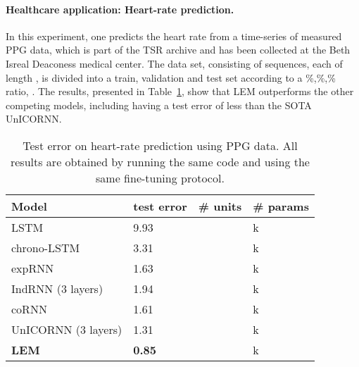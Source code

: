 \documentclass{article} \usepackage{iclr2022_conference,times}
\newcommand{\Tref}[1]{Table~\ref{#1}}
\begin{document}
\paragraph{Healthcare application: Heart-rate prediction.}
In this experiment, one predicts the heart rate from a time-series of measured PPG data, which is part of the TSR archive \citep{ai_healthcare} and has been collected at the Beth Isreal Deaconess medical center. The data set, consisting of  sequences, each of length , is divided into a train, validation and test set according to a \%,\%,\% ratio, \citep{log_ode,unicornn}. The results, presented in \Tref{tab:medical}, show that LEM outperforms the other competing models, including having a test  error of  less than the SOTA UnICORNN. 
\begin{table}[ht!]
  \caption{Test  error on heart-rate prediction using PPG data. All results are obtained by running the same code and using the same fine-tuning protocol.}
  \label{tab:medical}
  \centering
  \begin{tabular}{llll}
    \toprule
    \cmidrule(r){1-4}
    Model & test  error & \# units & \# params \\
    \midrule
LSTM  & 9.93 &  & k \\
chrono-LSTM  & 3.31 &  & k \\
expRNN &1.63 &  & k \\
IndRNN (3 layers) & 1.94 &  & k \\
coRNN & 1.61 &  & k \\
UnICORNN (3 layers) & 1.31 &  & k \\
\textbf{LEM} & \textbf{0.85} &  & k \\
    \bottomrule
  \end{tabular}
\end{table}
\end{document}
